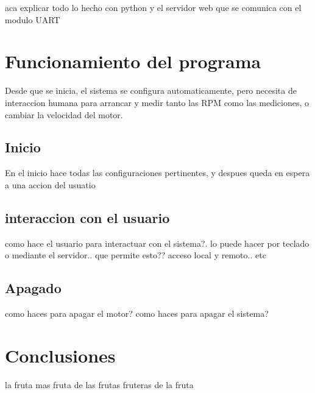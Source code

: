 \documentclass[a4paper]{article}
\begin{document}
aca explicar todo lo hecho con python y el servidor web que se comunica con el modulo UART


\section{Funcionamiento del programa} %
\label{sec:funcionamiento_del_programa}

Desde que se inicia, el sistema se configura automaticamente, pero necesita de interaccion humana para arrancar y medir tanto las RPM como las mediciones, o cambiar la velocidad del motor.

\subsection{Inicio} %
\label{sub:inicio}

En el inicio hace todas las configuraciones pertinentes, y despues queda en espera a una accion del usuatio


\subsection{interaccion con el usuario} %
\label{sub:interaccion_con_el_usuario}

como hace el usuario para interactuar con el sistema?. lo puede hacer por teclado o mediante el servidor.. que permite esto?? acceso local y remoto.. etc


\subsection{Apagado} %
\label{sub:apagado}

como haces para apagar el motor? como haces para apagar el sistema?




\section{Conclusiones} %
\label{sec:conclusiones}

la fruta mas fruta de las frutas fruteras de la fruta









 
\end{document}
